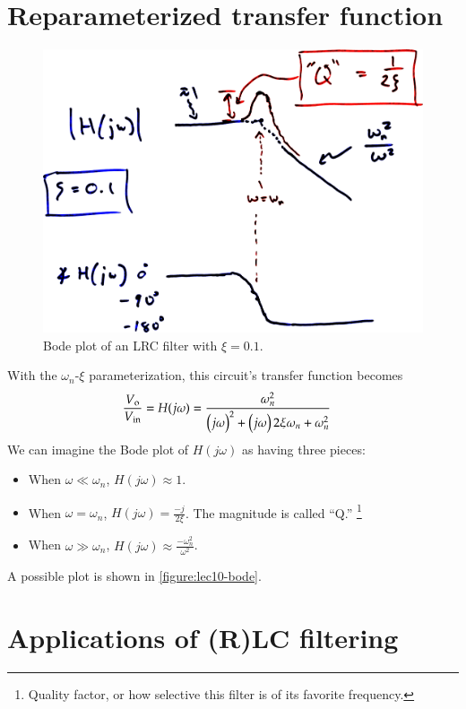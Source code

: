 \section{Reparameterized transfer function}
\begin{figure}
  \centering
  \includegraphics[width=0.8\linewidth]{figures/10/bode}
  \caption{Bode plot of an LRC filter with \(\xi = 0.1\).}
  \label{figure:lec10-bode}
\end{figure}
With the \(\omega_n\)-\(\xi\) parameterization, this circuit's transfer function becomes
\begin{align}
  \frac{V_\text{o}}{V_\text{in}}
  = H(j\omega)
  &= \frac{\omega_n^2}{\del{j\omega}^2 + \del{j\omega} 2 \xi \omega_n + \omega_n^2}
  \label{eq:lec10-LRC-tf}
\end{align}
We can imagine the Bode plot of \(H(j\omega)\) as having three pieces:
\begin{itemize}
  \item%
  When \(\omega \ll \omega_n\), \(H(j\omega) \approx 1 \).
  \item%
  When \(\omega = \omega_n\), \(H(j\omega)  = \frac{-j}{2\xi}\). The magnitude is called ``Q.''%
  \footnote{Quality factor, or how selective this filter is of its favorite frequency.}
  \item%
  When \(\omega \gg \omega_n\), \(H(j\omega)  \approx \frac{-\omega_n^2}{\omega^2}\).
\end{itemize}
A possible plot is shown in \autoref{figure:lec10-bode}.

\section{Applications of (R)LC filtering}
